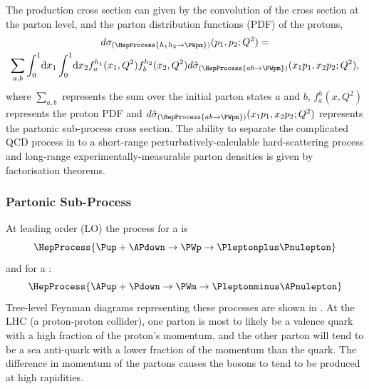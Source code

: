 The \PW production cross section can given by the convolution of the cross
section at the parton level, and the parton distribution functions (PDF) of the
protons,
\begin{multline}
  d\sigma_{(\HepProcess{h_1 h_2 \to \PWpm})}(p_1,p_2;Q^{2}) = \\
  \sum\limits_{a,b}
  \int_0^1 \! \mathrm{d} x_1 
  \int_0^1 \! \mathrm{d} x_2 
  f_a^{h_1}(x_1,Q^2)
  f_b^{h_2}(x_2,Q^2) 
  d\hat{\sigma}_{(\HepProcess{a b \to \PWpm})}(x_1 p_1, x_2 p_2; Q^2),
  \label{wbos:xsec}
\end{multline}
where $\sum\limits_{a,b}$ represents the sum over the initial parton states $a$
and $b$, $f_a^{h}(x,Q^2)$ represents the proton {PDF} and
$d\hat{\sigma}_{(\HepProcess{a b \to \PWpm})}(x_1 p_1, x_2 p_2; Q^2)$
represents the partonic sub-process cross section. The ability to separate the
complicated QCD process in to a short-range perturbatively-calculable
hard-scattering process and long-range experimentally-measurable parton
densities is given by factorisation theorems. 

\subsubsection*{Partonic Sub-Process}

At leading order (LO) the process for a \PWp is
\begin{equation}
  \HepProcess{\Pup + \APdown \to \PWp \to \Pleptonplus \Pnulepton} 
  \label{wbos:wpprod} 
\end{equation}
and for a \PWm:
\begin{equation}
  \HepProcess{\APup + \Pdown \to \PWm \to \Pleptonminus \APnulepton}
  \label{wbos:wmprod} 
\end{equation}
Tree-level Feynman diagrams representing these processes are shown in
.
At the {LHC} (a proton-proton collider), one parton is most to likely be a
valence quark with a high fraction of the proton's momentum, and the other
parton will tend to be a sea anti-quark with a lower fraction of the momentum
than the quark. The difference in momentum of the partons causes the \PW bosons 
to tend to be produced at high rapidities. 

